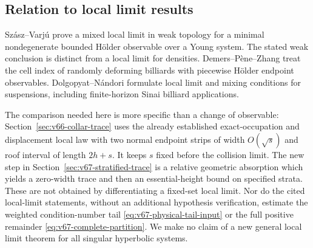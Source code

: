\subsection{Relation to local limit results}
Sz\'asz--Varj\'u \cite[Theorem 1.1 and the following remark]{SV}
prove a mixed local limit in weak topology for a minimal nondegenerate
bounded H\"older observable over a Young system. The stated weak
conclusion is distinct from a local limit for densities. Demers--P\`ene--Zhang
\cite{DPZ} treat the cell index of randomly deforming billiards with
piecewise H\"older endpoint observables. Dolgopyat--N\'andori \cite{DN}
formulate local limit and mixing conditions for suspensions, including
finite-horizon Sinai billiard applications.

The comparison needed here is more specific than a change of observable:
Section~\ref{sec:v66-collar-trace} uses the already established
exact-occupation and displacement local law with two normal endpoint
strips of width $O(\sqrt s)$ and roof interval of length $2h+s$.
It keeps $s$ fixed before the collision limit. The new step in
Section~\ref{sec:v67-stratified-trace} is a relative geometric absorption
which yields a zero-width trace and then an essential-height bound on
specified strata. These are not obtained by differentiating a fixed-set
local limit. Nor do the cited local-limit statements, without an
additional hypothesis verification, estimate the weighted condition-number
tail \eqref{eq:v67-physical-tail-input} or the full positive remainder
\eqref{eq:v67-complete-partition}. We make no claim of a new general
local limit theorem for all singular hyperbolic systems.

\label{end:v67-new-mathematics}
